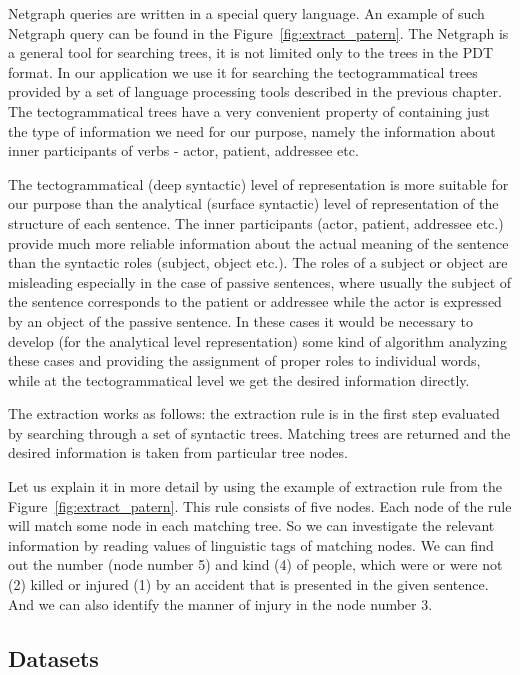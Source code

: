 Netgraph queries are written in a special query language. An example of such Netgraph query can be found in the Figure~\ref{fig:extract_patern}. The Netgraph is a general tool for searching trees, it is not limited only to the trees in the PDT format. In our application we use it for searching the tectogrammatical trees provided by a set of language processing tools described in the previous chapter.  The tectogrammatical trees have a very convenient property of containing just the type of information we need for our purpose, namely the information about inner participants of verbs - actor, patient, addressee etc. 

The tectogrammatical (deep syntactic) level of representation is more suitable for our purpose than the analytical (surface syntactic) level of representation of the structure of each sentence. The inner participants (actor, patient, addressee etc.) provide much more reliable information about the actual meaning of the sentence than the syntactic roles (subject, object etc.). The roles of a subject or object are misleading especially in the case of passive sentences, where usually the subject of the sentence corresponds to the patient or addressee while the actor is expressed by an object of the passive sentence. In these cases it would be necessary to develop (for the analytical level representation) some kind of algorithm analyzing these cases and providing the assignment of proper roles to individual words, while at the tectogrammatical level we get the desired information directly.

The extraction works as follows: the extraction rule is in the first step evaluated by searching through a set of syntactic trees. Matching trees are returned and the desired information is taken from particular tree nodes.


Let us explain it in more detail by using the example of extraction rule from the Figure~\ref{fig:extract_patern}. This rule consists of five nodes. Each node of the rule will match some node in each matching tree. So we can investigate the relevant information by reading values of linguistic tags of matching nodes. We can find out the number (node number 5) and kind (4) of people, which were or were not (2) killed or injured (1) by an accident that is presented in the given sentence. And we can also identify the manner of injury in the node number 3.


\subsection{Datasets}

